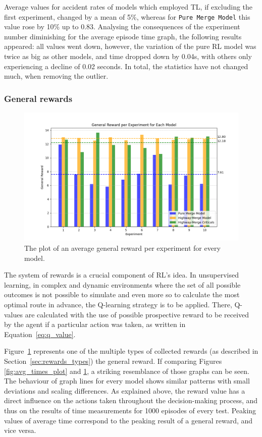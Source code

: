 Average values for accident rates of models which employed TL, if excluding the first experiment, changed by a mean of 5\%, whereas for \texttt{Pure Merge Model} this value rose by 10\% up to 0.83. Analysing the consequences of the experiment number diminishing for the average episode time graph, the following results appeared: all values went down, however, the variation of the pure RL model was twice as big as other models, and time dropped down by 0.04s, with others only experiencing a decline of 0.02 seconds. In total, the statistics have not changed much, when removing the outlier.

\subsubsection{General rewards}\label{sec:gen_rewards_results}

\begin{figure}[H]
    \centering
    \includegraphics[width=\textwidth]{images/General_rewards.png}
    \caption{The plot of an average general reward per experiment for every model.}
    \label{fig:gen_rewards}
\end{figure}

The system of rewards is a crucial component of RL's idea. In unsupervised learning, in complex and dynamic environments where the set of all possible outcomes is not possible to simulate and even more so to calculate the most optimal route in advance, the Q-learning strategy is to be applied. There, Q-values are calculated with the use of possible prospective reward to be received by the agent if a particular action was taken, as written in Equation~\ref{eq:q_value}.

Figure~\ref{fig:gen_rewards} represents one of the multiple types of collected rewards (as described in Section~\ref{sec:rewards_types}) the general reward. If comparing Figures \ref{fig:avg_times_plot} and \ref{fig:gen_rewards}, a striking resemblance of those graphs can be seen. The behaviour of graph lines for every model shows similar patterns with small deviations and scaling differences. As explained above, the reward value has a direct influence on the actions taken throughout the decision-making process, and thus on the results of time measurements for 1000 episodes of every test. Peaking values of average time correspond to the peaking result of a general reward, and vice versa.

